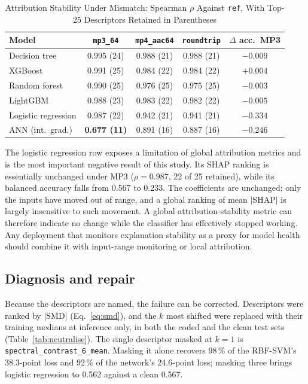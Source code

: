 \documentclass[lettersize,journal]{IEEEtran}
\newcommand{\ttf}[1]{\texttt{\footnotesize #1}}
\begin{document}
\begin{table}[!t]
\caption{Attribution Stability Under Mismatch: Spearman $\rho$ Against \ttf{ref}, With Top-25 Descriptors Retained in Parentheses}
\label{tab:stability}
\centering
\scriptsize
\setlength{\tabcolsep}{3pt}
\begin{tabular}{@{}lcccc@{}}
\toprule
Model & \ttf{mp3\_64} & \ttf{mp4\_aac64} & \ttf{roundtrip} & $\Delta$ acc.\ MP3\\
\midrule
Decision tree       & 0.995 (24) & 0.988 (21) & 0.988 (21) & $-0.009$\\
XGBoost             & 0.991 (25) & 0.984 (22) & 0.984 (22) & $+0.004$\\
Random forest       & 0.990 (25) & 0.976 (25) & 0.975 (25) & $-0.003$\\
LightGBM            & 0.988 (23) & 0.983 (22) & 0.982 (22) & $-0.005$\\
Logistic regression & 0.987 (22) & 0.942 (21) & 0.941 (21) & $\mathbf{-0.334}$\\
ANN (int.\ grad.)   & \textbf{0.677 (11)} & 0.891 (16) & 0.887 (16) & $-0.246$\\
\bottomrule
\end{tabular}
\end{table}

The logistic regression row exposes a limitation of global attribution
metrics and is the most important negative result of this study. Its SHAP
ranking is essentially unchanged under MP3 ($\rho=0.987$, 22 of 25 retained),
while its balanced accuracy falls from 0.567 to 0.233. The coefficients are
unchanged; only the inputs have moved out of range, and a global ranking of mean
$|$SHAP$|$ is largely insensitive to such movement. A global
attribution-stability metric can therefore indicate no change while the
classifier has effectively stopped working. Any deployment that monitors
explanation stability as a proxy for model health should combine it with
input-range monitoring or local attribution.

\subsection{Diagnosis and repair}\label{sec:neutralise}
Because the descriptors are named, the failure can be corrected. Descriptors
were ranked by $|\mathrm{SMD}|$ (Eq.~\eqref{eq:smd}), and the $k$ most shifted
were replaced with their training medians at inference only, in both the coded and
the clean test sets (Table~\ref{tab:neutralise}). The single descriptor masked
at $k=1$ is \ttf{spectral\_contrast\_6\_mean}. Masking it alone recovers 98\,\%
of the RBF-SVM's 38.3-point loss and 92\,\% of the network's 24.6-point loss;
masking three brings logistic regression to 0.562 against a clean 0.567.
\end{document}
